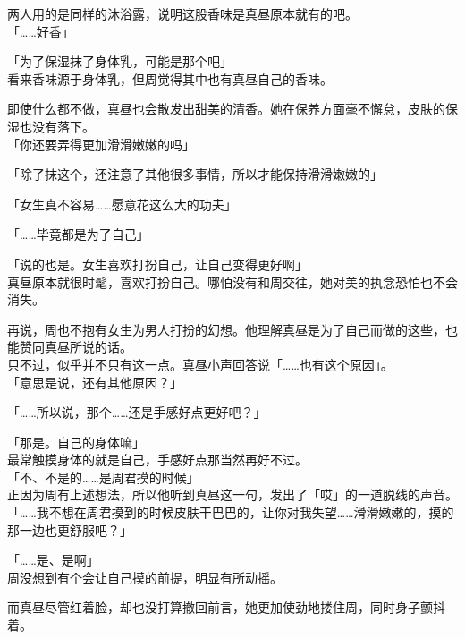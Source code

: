 两人用的是同样的沐浴露，说明这股香味是真昼原本就有的吧。\\

「……好香」

「为了保湿抹了身体乳，可能是那个吧」\\

看来香味源于身体乳，但周觉得其中也有真昼自己的香味。

即使什么都不做，真昼也会散发出甜美的清香。她在保养方面毫不懈怠，皮肤的保湿也没有落下。\\

「你还要弄得更加滑滑嫩嫩的吗」

「除了抹这个，还注意了其他很多事情，所以才能保持滑滑嫩嫩的」

「女生真不容易……愿意花这么大的功夫」

「……毕竟都是为了自己」

「说的也是。女生喜欢打扮自己，让自己变得更好啊」\\

真昼原本就很时髦，喜欢打扮自己。哪怕没有和周交往，她对美的执念恐怕也不会消失。

再说，周也不抱有女生为男人打扮的幻想。他理解真昼是为了自己而做的这些，也能赞同真昼所说的话。\\

只不过，似乎并不只有这一点。真昼小声回答说「……也有这个原因」。\\

「意思是说，还有其他原因？」

「……所以说，那个……还是手感好点更好吧？」

「那是。自己的身体嘛」\\

最常触摸身体的就是自己，手感好点那当然再好不过。\\

「不、不是的……是周君摸的时候」\\

正因为周有上述想法，所以他听到真昼这一句，发出了「哎」的一道脱线的声音。\\

「……我不想在周君摸到的时候皮肤干巴巴的，让你对我失望……滑滑嫩嫩的，摸的那一边也更舒服吧？」

「……是、是啊」\\

周没想到有个会让自己摸的前提，明显有所动摇。

而真昼尽管红着脸，却也没打算撤回前言，她更加使劲地搂住周，同时身子颤抖着。\\

